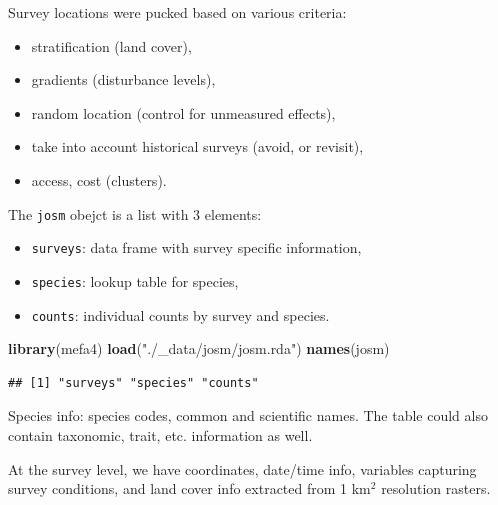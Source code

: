 \documentclass[12pt,]{book}
\newenvironment{Shaded}{\begin{snugshade}}{\end{snugshade}}
\newcommand{\KeywordTok}[1]{\textcolor[rgb]{0.13,0.29,0.53}{\textbf{#1}}}
\newcommand{\NormalTok}[1]{#1}
\newcommand{\OperatorTok}[1]{\textcolor[rgb]{0.81,0.36,0.00}{\textbf{#1}}}
\newcommand{\StringTok}[1]{\textcolor[rgb]{0.31,0.60,0.02}{#1}}
\providecommand{\tightlist}{%
  \setlength{\itemsep}{0pt}\setlength{\parskip}{0pt}}
\begin{document}
Survey locations were pucked based on various criteria:

\begin{itemize}
\tightlist
\item
  stratification (land cover),
\item
  gradients (disturbance levels),
\item
  random location (control for unmeasured effects),
\item
  take into account historical surveys (avoid, or revisit),
\item
  access, cost (clusters).
\end{itemize}

The \texttt{josm} obejct is a list with 3 elements:

\begin{itemize}
\tightlist
\item
  \texttt{surveys}: data frame with survey specific information,
\item
  \texttt{species}: lookup table for species,
\item
  \texttt{counts}: individual counts by survey and species.
\end{itemize}

\begin{Shaded}
\begin{Highlighting}[]
\KeywordTok{library}\NormalTok{(mefa4)}
\KeywordTok{load}\NormalTok{(}\StringTok{"./_data/josm/josm.rda"}\NormalTok{)}
\KeywordTok{names}\NormalTok{(josm)}
\end{Highlighting}
\end{Shaded}

\begin{verbatim}
## [1] "surveys" "species" "counts"
\end{verbatim}

Species info: species codes, common and scientific names. The table could also contain
taxonomic, trait, etc. information as well.

\begin{Shaded}
\end{Shaded}

At the survey level, we have coordinates, date/time info,
variables capturing survey conditions, and land cover info extracted from 1 km\(^2\) resolution rasters.

\begin{Shaded}
\end{Shaded}
\end{document}
